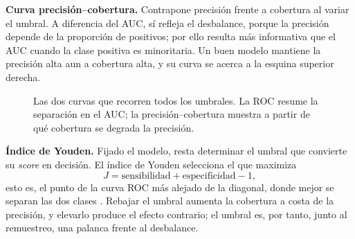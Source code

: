 \documentclass[12pt,a4paper]{report}
\theoremstyle{definition}
\begin{document}
\medskip
\noindent\textbf{Curva precisión--cobertura.} Contrapone precisión frente a cobertura al variar el umbral. A
diferencia del AUC, sí refleja el desbalance, porque la precisión depende de la proporción de
positivos; por ello resulta más informativa que el AUC cuando la clase positiva es minoritaria. Un buen
modelo mantiene la precisión alta aun a cobertura alta, y su curva se acerca a la esquina superior
derecha.

\begin{figure}[H]
\centering
{}
\caption{Las dos curvas que recorren todos los umbrales. La ROC resume la separación en el AUC; la
precisión--cobertura muestra a partir de qué cobertura se degrada la precisión.}
\label{fig:curvas}
\end{figure}

\medskip
\noindent\textbf{Índice de Youden.} Fijado el modelo, resta determinar el umbral que convierte su
\emph{score} en decisión. El índice de Youden selecciona el que maximiza
\begin{equation}
J = \mathrm{sensibilidad} + \mathrm{especificidad} - 1,
\label{eq:youden}
\end{equation}
esto es, el punto de la curva ROC más alejado de la diagonal, donde mejor se separan las dos clases
\cite{youden1950index}. Rebajar el umbral aumenta la cobertura a costa de la precisión, y elevarlo
produce el efecto contrario; el umbral es, por tanto, junto al remuestreo, una palanca frente al
desbalance.



\end{document}

